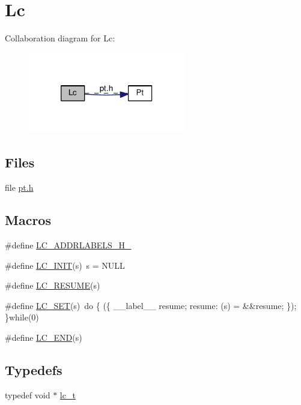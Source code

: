 \hypertarget{group__lc}{\section{Lc}
\label{group__lc}
}
Collaboration diagram for Lc\+:\nopagebreak
\begin{figure}[H]
\begin{center}
\leavevmode
\includegraphics[width=194pt]{group__lc}
\end{center}
\end{figure}
\subsection*{Files}
\begin{DoxyCompactItemize}
\item 
file \hyperlink{pt_8h}{pt.\+h}
\end{DoxyCompactItemize}
\subsection*{Macros}
\begin{DoxyCompactItemize}
\item 
\#define \hyperlink{group__lc_ga7afd9aec93a47883fbdbaae75d571904}{L\+C\+\_\+\+A\+D\+D\+R\+L\+A\+B\+E\+L\+S\+\_\+\+H\+\_\+}
\item 
\#define \hyperlink{group__lc_ga2c1bb4fa6d7a6ff951a41c73fc721109}{L\+C\+\_\+\+I\+N\+I\+T}(s)~s = N\+U\+L\+L
\item 
\#define \hyperlink{group__lc_ga1ec8b8f4710dce1fa7fb87d3a31541ae}{L\+C\+\_\+\+R\+E\+S\+U\+M\+E}(s)
\item 
\#define \hyperlink{group__lc_gad8eec328a4868d767f0c00c8d1c6cfc1}{L\+C\+\_\+\+S\+E\+T}(s)~do \{ (\{ \+\_\+\+\_\+label\+\_\+\+\_\+ resume; resume\+: (s) = \&\&resume; \}); \}while(0)
\item 
\#define \hyperlink{group__lc_gaca51ceb2f5d855dfde55bcedf8d3b92d}{L\+C\+\_\+\+E\+N\+D}(s)
\end{DoxyCompactItemize}
\subsection*{Typedefs}
\begin{DoxyCompactItemize}
\item 
typedef void $\ast$ \hyperlink{group__lc_ga2bdc4b7b4038454a79f1b2a94a6d2a98}{lc\+\_\+t}
\end{DoxyCompactItemize}


